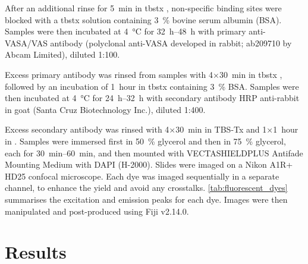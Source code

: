 After an additional rinse for \qty{5}{\minute} in \gls{tbstx} \zeroonepercent, non-specific binding sites were blocked with a \gls{tbstx} \zeroonepercent solution containing \qty{3}{\percent} bovine serum albumin (BSA). Samples were then incubated at \qty{4}{\degreeCelsius} for \qtyrange{32}{48}{\hour} with primary anti-VASA/VAS antibody (polyclonal anti-VASA developed in rabbit; ab209710 by Abcam Limited), diluted 1:100.

Excess primary antibody was rinsed from samples with 4×\qty{30}{\minute} in \gls{tbstx} \zeroonepercent, followed by an incubation of \qty{1}{hour} in \gls{tbstx} \zeroonepercent containing \qty{3}{\percent} BSA. Samples were then incubated at \qty{+4}{\degreeCelsius} for \qtyrange{24}{32}{\hour} with secondary antibody HRP anti-rabbit in goat (Santa Cruz Biotechnology Inc.), diluted 1:400.

Excess secondary antibody was rinsed with 4×\qty{30}{\minute} in TBS-Tx \zeroonepercent and 1×\qty{1}{hour} in  \onepercent. Samples were immersed first in \qty{50}{\percent} glycerol and then in \qty{75}{\percent} glycerol, each for \qtyrange{30}{60}{\minute}, and then mounted with VECTASHIELD\textregistered PLUS Antifade Mounting Medium with DAPI (H-2000). Slides were imaged on a Nikon A1R+ HD25 confocal microscope. Each dye was imaged sequentially in a separate channel, to enhance the yield and avoid any crosstalks. \cref{tab:fluorescent_dyes} summarises the excitation and emission peaks for each dye. Images were then manipulated and post-produced using Fiji v2.14.0.

\section{Results} \label{chapter:insitu-results}
